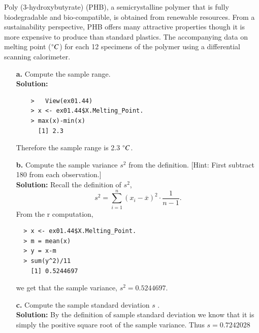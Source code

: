 \documentclass[12pt]{article}
\makeatletter
\theoremstyle{homework}
\newenvironment{exercise}[1]
{\def\@currentlabel{#1}\exercisecore}
{\endexercisecore}
\makeatother
\begin{document}
\begin{exercise}{1.44} Poly (3-hydroxybutyrate) (PHB), a semicrystalline polymer that is fully biodegradable and bio-compatible,
  is obtained from renewable resources. From a sustainability perspective, PHB offers many attractive properties though it is more expensive
  to produce than standard plastics. The accompanying data on melting point ($\degree C$) for each 12 specimens of the polymer using a differential scanning
  calorimeter. 
\begin{enumerate}
  \item[\textbf{a.}] Compute the sample range.\\
  
  \textbf{Solution:} 
  \begin{lstlisting}
    >   View(ex01.44)
    > x <- ex01.44$X.Melting_Point.
    > max(x)-min(x)
      [1] 2.3
  \end{lstlisting}
  Therefore the sample range is 2.3 $\degree C$.
  \vspace{.5in}


  \item[\textbf{b.}] Compute the sample variance $s^2$ from the definition. [Hint: First subtract 180 from each observation.]\\
  
  \textbf{Solution:}
  Recall the definition of $s^2$,
  \begin{equation*}
    s^2 = \sum_{i = 1}^n (x_i - \overline{x})^2 \cdot \frac{1}{n-1}.
  \end{equation*}
  From the r computation,
  \begin{lstlisting}
  > x <- ex01.44$X.Melting_Point.
  > m = mean(x)
  > y = x-m
  > sum(y^2)/11
    [1] 0.5244697
  \end{lstlisting}
  we get that the sample variance, $s^2 = 0.5244697$.
  \vspace{.5in}


  \item[\textbf{c.}] Compute the sample standard deviation $s$ .\\
  
  \textbf{Solution:}
  By the definition of sample standard deviation we know that it is simply the positive square root of the sample variance. Thus $s = 0.7242028$
   
\end{enumerate}
\end{exercise}
\vspace{1in}
\end{document}
